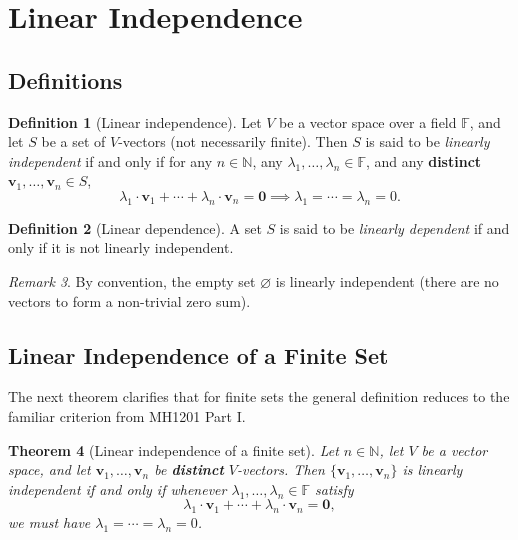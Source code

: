 \documentclass[11pt, a4paper, notitlepage]{report}
\newtheorem{theorem}{Theorem}[section]
\theoremstyle{definition}
\newtheorem{definition}[theorem]{Definition}
\theoremstyle{remark}
\newtheorem{remark}[theorem]{Remark}
\begin{document}
\section{Linear Independence}
\label{sec:linear-independence}

\subsection{Definitions}

\begin{definition}[Linear independence]\label{def:lin-indep}
Let $V$ be a vector space over a field $\mathbb{F}$, and let $S$ be a set of $V$-vectors (not necessarily finite). Then $S$ is said to be \emph{linearly independent} if and only if for any $n \in \mathbb{N}$, any $\lambda_1, \ldots, \lambda_n \in \mathbb{F}$, and any \textbf{distinct} $\mathbf{v}_1, \ldots, \mathbf{v}_n \in S$,
\[
  \lambda_1 \cdot \mathbf{v}_1 + \cdots + \lambda_n \cdot \mathbf{v}_n = \mathbf{0} \implies \lambda_1 = \cdots = \lambda_n = 0.
\]
\end{definition}

\begin{definition}[Linear dependence]\label{def:lin-dep}
A set $S$ is said to be \emph{linearly dependent} if and only if it is not linearly independent.
\end{definition}

\begin{remark}
By convention, the empty set $\varnothing$ is linearly independent (there are no vectors to form a non-trivial zero sum).
\end{remark}

\subsection{Linear Independence of a Finite Set}

The next theorem clarifies that for finite sets the general definition reduces to the familiar criterion from MH1201 Part I.

\begin{theorem}[Linear independence of a finite set]\label{thm:finite-lin-indep}
Let $n \in \mathbb{N}$, let $V$ be a vector space, and let $\mathbf{v}_1, \ldots, \mathbf{v}_n$ be \textbf{distinct} $V$-vectors. Then $\{\mathbf{v}_1, \ldots, \mathbf{v}_n\}$ is linearly independent if and only if whenever $\lambda_1, \ldots, \lambda_n \in \mathbb{F}$ satisfy
\[
  \lambda_1 \cdot \mathbf{v}_1 + \cdots + \lambda_n \cdot \mathbf{v}_n = \mathbf{0},
\]
we must have $\lambda_1 = \cdots = \lambda_n = 0$.
\end{theorem}
\end{document}
